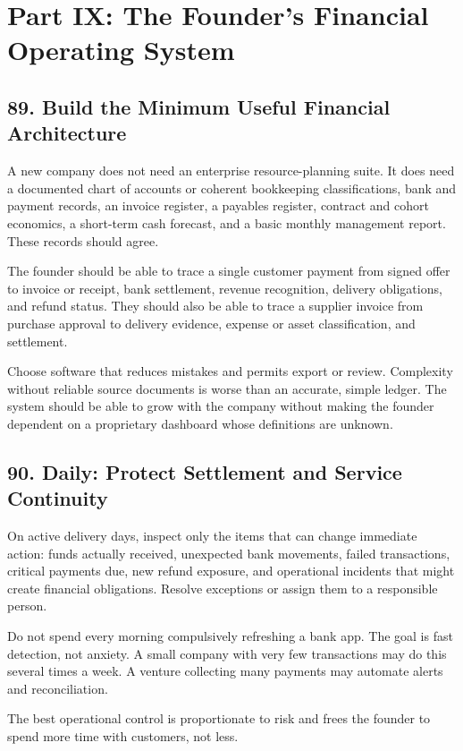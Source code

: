 \section*{Part IX: The Founder's Financial Operating System}

\subsection*{89. Build the Minimum Useful Financial Architecture}

A new company does not need an enterprise resource-planning suite. It does need a documented chart of accounts or coherent bookkeeping classifications, bank and payment records, an invoice register, a payables register, contract and cohort economics, a short-term cash forecast, and a basic monthly management report. These records should agree.

The founder should be able to trace a single customer payment from signed offer to invoice or receipt, bank settlement, revenue recognition, delivery obligations, and refund status. They should also be able to trace a supplier invoice from purchase approval to delivery evidence, expense or asset classification, and settlement.

Choose software that reduces mistakes and permits export or review. Complexity without reliable source documents is worse than an accurate, simple ledger. The system should be able to grow with the company without making the founder dependent on a proprietary dashboard whose definitions are unknown.

\subsection*{90. Daily: Protect Settlement and Service Continuity}

On active delivery days, inspect only the items that can change immediate action: funds actually received, unexpected bank movements, failed transactions, critical payments due, new refund exposure, and operational incidents that might create financial obligations. Resolve exceptions or assign them to a responsible person.

Do not spend every morning compulsively refreshing a bank app. The goal is fast detection, not anxiety. A small company with very few transactions may do this several times a week. A venture collecting many payments may automate alerts and reconciliation.

The best operational control is proportionate to risk and frees the founder to spend more time with customers, not less.

